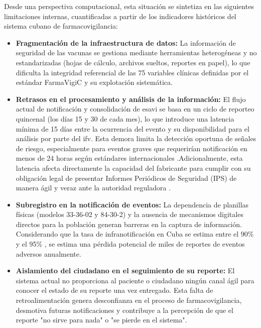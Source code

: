 Desde una perspectiva computacional, esta situación se sintetiza en las siguientes limitaciones internas, cuantificadas a partir de los indicadores históricos del sistema cubano de farmacovigilancia:


\begin{itemize}
\item \textbf{Fragmentación de la infraestructura de datos:} La información de seguridad de las vacunas se gestiona mediante herramientas heterogéneas y no estandarizadas (hojas de cálculo, archivos sueltos, reportes en papel), lo que dificulta la integridad referencial de las 75 variables clínicas definidas por el estándar \gls{FarmaVigiC} y su explotación sistemática.

\item \textbf{Retrasos en el procesamiento y análisis de la información:} El flujo actual de notificación y consolidación de \gls{esavi} se basa en un ciclo de reporteo quincenal (los días 15 y 30 de cada mes), lo que introduce una latencia mínima de 15 días entre la ocurrencia del evento y su disponibilidad para el análisis por parte del \gls{ifv}. Esta demora limita la detección oportuna de señales de riesgo, especialmente para eventos graves que requerirían notificación en menos de 24 horas según estándares internacionales \cite{who_pharmacovigilance_2004}.Adicionalmente, esta latencia afecta directamente la capacidad del fabricante para cumplir con su obligación legal de presentar Informes Periódicos de Seguridad (IPS) de manera ágil y veraz ante la autoridad reguladora \cite{normas_farmacovigilancia_cuba_2012}.
 
\item \textbf{Subregistro en la notificación de eventos:} La dependencia de planillas físicas (modelos 33-36-02 y 84-30-2) y la ausencia de mecanismos digitales directos para la población generan barreras en la captura de información. Considerando que la tasa de infranotificación en Cuba se estima entre el 90\% y el 95\% \cite{tarrago_farmacovigilancia_cuba_2019}, se estima una pérdida potencial de miles de reportes de eventos adversos anualmente.

\item \textbf{Aislamiento del ciudadano en el seguimiento de su reporte:} El sistema actual no proporciona al paciente o ciudadano ningún canal ágil para conocer el estado de su reporte una vez entregado. Esta falta de retroalimentación genera desconfianza en el proceso de farmacovigilancia, desmotiva futuras notificaciones y contribuye a la percepción de que el reporte "no sirve para nada" o "se pierde en el sistema".
 
\end{itemize}


